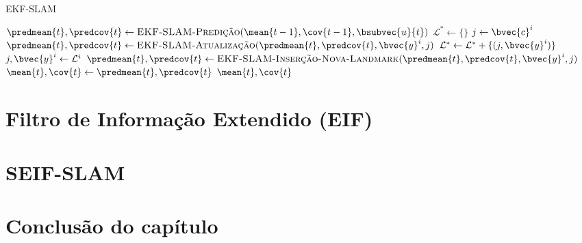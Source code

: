 \begin{algorithm}[h]
  \caption{EKF-SLAM}
  \label{alg:ekf-slam-full}
\begin{algorithmic}[1]
    \State $\predmean{t}, \predcov{t} \gets \textproc{EKF-SLAM-Predição}(\mean{t-1}, \cov{t-1}, \bsubvec{u}{t})$
    \State $\mathcal{L}^{*} \gets \{\}$ 
      \State $j \gets \bvec{c}^i$
        \State $\predmean{t}, \predcov{t} \gets \textproc{EKF-SLAM-Atualização}(\predmean{t}, \predcov{t}, \bvec{y}^i, j)$
      \Else
        \State $\mathcal{L}^* \gets \mathcal{L}^* + \{(j, \bvec{y}^i)\}$
      \EndIf
    \EndFor
      \State $j, \bvec{y}^i \gets \mathcal{L}^i$
      \State $\predmean{t}, \predcov{t} \gets \textproc{EKF-SLAM-Inserção-Nova-Landmark}(\predmean{t}, \predcov{t}, \bvec{y}^i, j)$
    \EndFor
    \State $\mean{t}, \cov{t} \gets \predmean{t}, \predcov{t}$
    \State \Return $\mean{t}, \cov{t}$
  \EndProcedure
\end{algorithmic}
\end{algorithm}

\section{Filtro de Informação Extendido (EIF)}

\section{SEIF-SLAM}

\section{Conclusão do capítulo}